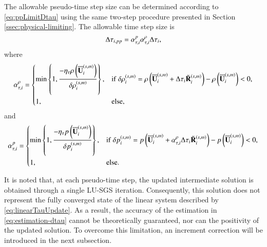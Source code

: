The allowable pseudo-time step size can be determined according to \eqref{eq:ppLimitDtau}
using the same two-step procedure presented in Section \ref{ssec:physical-limiting}.
The allowable time step size is 
\begin{equation}
    \label{eq:alpha-tau}
    \mathrm\Delta \tau_{i,pp}= \alpha_{\tau,i}^{p}\alpha_{\tau,i}^{\rho} \mathrm\Delta  \tau_{i},
\end{equation}
where
\begin{equation}
    \label{eq:alpha-tau-rho}
    \alpha_{\tau,i}^{\rho} = \begin{dcases}
        \min\left\{1, \dfrac{-\eta_\tau \rho\left(\overline{\mathbf{U}}^{\left(s,m\right)}_i\right)}{\delta \rho_i^{\left(s,m\right)}} \right\}, & \mathrm{if} \ \delta \rho_i^{\left(s,m\right)}= \rho\left(\overline{\mathbf{U}}^{\left(s,m\right)}_i + \mathrm\Delta \tau_{i} \tilde{\mathbf{R}}^{\left(s,m\right)}_i\right) - \rho\left(\overline{\mathbf{U}}^{\left(s,m\right)}_i\right) < 0, \\
        1, & \mathrm{else},
    \end{dcases}
\end{equation}
and
\begin{equation}
    \label{eq:alpha-tau-p}
    \alpha_{\tau,i}^{p} = \begin{dcases}
        \min\left\{1, \dfrac{-\eta_\tau p \left(\overline{\mathbf{U}}^{\left(s,m\right)}_i\right)}{\delta p_i^{\left(s,m\right)}} \right\}, & \mathrm{if} \ \delta p_i^{\left(s,m\right)} = p \left(\overline{\mathbf{U}}^{\left(s,m\right)}_i + \alpha_{\tau,i}^{\rho} \mathrm\Delta \tau_{i} \tilde{\mathbf{R}}^{\left(s,m\right)}_i\right) -p \left(\overline{\mathbf{U}}^{\left(s,m\right)}_i\right) < 0, \\
        1, &\mathrm{else}.
    \end{dcases}
\end{equation}

It is noted that, at each pseudo-time step, the updated intermediate solution is obtained through a single LU-SGS iteration. Consequently, this solution does not represent the fully converged state of the linear system described by \eqref{eq:linearTauUpdate}. As a result, the accuracy of the estimation in \eqref{eq:estimation-dtau} cannot be theoretically guaranteed, nor can the positivity of the updated solution. %
To overcome this limitation, an increment correction will be introduced in the next subsection.

